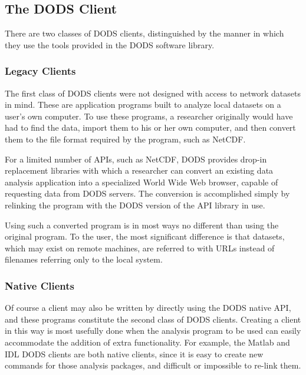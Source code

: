 \documentclass[12pt]{article}
\begin{document}
\subsection{The DODS Client}
\label{clients}

There are two classes of \ac{DODS} clients, distinguished by the manner in
which they use the tools provided in the \ac{DODS} software library.

\subsubsection{Legacy Clients}
\label{legacy}

The first class of \ac{DODS} clients were not designed with access to network
datasets in mind.  These are application programs built to analyze local
datasets on a user's own computer.  To use these programs, a researcher
originally would have had to find the data, import them to his or her own
computer, and then convert them to the file format required by the program,
such as \acs{NetCDF}.

For a limited number of \ac{API}s, such as \acs{NetCDF}, \ac{DODS} provides
drop-in replacement libraries with which a researcher can convert an existing
data analysis application into a specialized World Wide Web browser, capable
of requesting data from \ac{DODS} servers.  The conversion is accomplished
simply by relinking the program with the \ac{DODS} version of the \ac{API}
library in use.

Using such a converted program is in most ways no different than using the
original program.  To the user, the most significant difference is that
datasets, which may exist on remote machines, are referred to with \acs{URL}s
instead of filenames referring only to the local system.

\subsubsection{Native Clients}

Of course a client may also be written by directly using the \ac{DODS} native
\ac{API}, and these programs constitute the second class of \ac{DODS}
clients.  Creating a client in this way is most usefully done when the
analysis program to be used can easily accommodate the addition of extra
functionality.  For example, the Matlab and IDL \ac{DODS} clients are both
native clients, since it is easy to create new commands for those analysis
packages, and difficult or impossible to re-link them.
\end{document}
